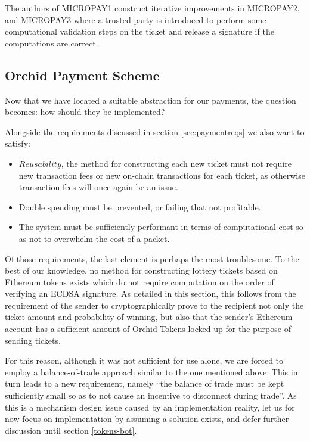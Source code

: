 The authors of MICROPAY1 construct iterative improvements in MICROPAY2, and MICROPAY3 where a trusted party is introduced to perform some computational validation steps on the ticket and release a signature if the computations are correct.

\subsection{Orchid Payment Scheme}
\label{sec:orchid-payments}

Now that we have located a suitable abstraction for our payments, the question becomes: how should they be implemented?

Alongside the requirements discussed in section \ref{sec:paymentreqs} we also want to satisfy:
\begin{itemize}
  \item $Reusability$, the method for constructing each new ticket must not require new transaction fees or new on-chain transactions for each ticket, as otherwise transaction fees will once again be an issue.
  \item Double spending must be prevented, or failing that not profitable.
  \item The system must be sufficiently performant in terms of computational cost so as not to overwhelm the cost of a packet.
\end{itemize}

Of those requirements, the last element is perhaps the most troublesome. To the best of our knowledge, no method for constructing lottery tickets based on Ethereum tokens exists which do not require computation on the order of verifying an ECDSA signature. As detailed in this section, this follows from the requirement of the sender to cryptographically prove to the recipient not only the ticket amount and probability of winning, but also that the sender's Ethereum account has a sufficient amount of Orchid Tokens locked up for the purpose of sending tickets.

For this reason, although it was not sufficient for use alone, we are forced to employ a balance-of-trade approach similar to the one mentioned above. This in turn leads to a new requirement, namely ``the balance of trade must be kept sufficiently small so as to not cause an incentive to disconnect during trade''. As this is a mechanism design issue caused by an implementation reality, let us for now focus on implementation by assuming a solution exists, and defer further discussion until section \ref{tokens-bot}.

